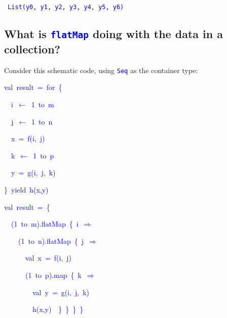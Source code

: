 \texttt{\textcolor{blue}{\footnotesize{}  List(y0, y1, y2, y3, y4,
y5, y6)}} 


\subsection{What is \texttt{\textcolor{blue}{\footnotesize{}flatMap}} doing with
the data in a collection?}

Consider this schematic code, using \texttt{\textcolor{blue}{\footnotesize{}Seq}}
as the container type:\texttt{\textcolor{blue}{\footnotesize{} }}%
\begin{minipage}[t]{0.49\columnwidth}%
\begin{lyxcode}
\textcolor{blue}{\footnotesize{}val~result~=~for~\{}{\footnotesize\par}

\textcolor{blue}{\footnotesize{}~~i~$\leftarrow$~1~to~m}{\footnotesize\par}

\textcolor{blue}{\footnotesize{}~~j~$\leftarrow$~1~to~n}{\footnotesize\par}

\textcolor{blue}{\footnotesize{}~~x~=~f(i,~j)}{\footnotesize\par}

\textcolor{blue}{\footnotesize{}~~k~$\leftarrow$~1~to~p}{\footnotesize\par}

\textcolor{blue}{\footnotesize{}~~y~=~g(i,~j,~k)}{\footnotesize\par}

\textcolor{blue}{\footnotesize{}\}~yield~h(x,y)}{\footnotesize\par}
\end{lyxcode}
%
\end{minipage}\texttt{\textcolor{blue}{\footnotesize{}}}%
\begin{minipage}[t]{0.49\columnwidth}%
\begin{lyxcode}
\textcolor{blue}{\footnotesize{}val~result~=~\{}{\footnotesize\par}

\textcolor{blue}{\footnotesize{}~~(1~to~m).flatMap~\{~i~$\Rightarrow$}{\footnotesize\par}

\textcolor{blue}{\footnotesize{}~~~~(1~to~n).flatMap~\{~j~$\Rightarrow$}{\footnotesize\par}

\textcolor{blue}{\footnotesize{}~~~~~~val~x~=~f(i,~j)}{\footnotesize\par}

\textcolor{blue}{\footnotesize{}~~~~~~(1~to~p).map~\{~k~$\Rightarrow$}{\footnotesize\par}

\textcolor{blue}{\footnotesize{}~~~~~~~~val~y~=~g(i,~j,~k)}{\footnotesize\par}

\textcolor{blue}{\footnotesize{}~~~~~~~~h(x,y)~~\}~\}~\}~\}}{\footnotesize\par}
\end{lyxcode}
%
\end{minipage}\texttt{\textcolor{blue}{\footnotesize{}\medskip{}
}}{\footnotesize\par}


